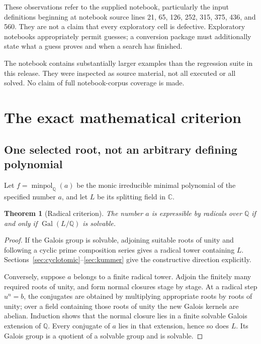 \documentclass[11pt,a4paper]{article}
\newcommand{\Q}{\mathbb Q}
\newcommand{\C}{\mathbb C}
\newcommand{\Gal}{\operatorname{Gal}}
\newcommand{\minpol}{\operatorname{minpol}}
\newtheorem{theorem}{Theorem}[section]
\theoremstyle{definition}
\theoremstyle{remark}
\begin{document}
These observations refer to the supplied notebook, particularly the input definitions beginning at notebook source lines 21, 65, 126, 252, 315, 375, 436, and 560. They are not a claim that every exploratory cell is defective. Exploratory notebooks appropriately permit guesses; a conversion package must additionally state what a guess proves and when a search has finished.

The notebook contains substantially larger examples than the regression suite in this release. They were inspected as source material, not all executed or all solved. No claim of full notebook-corpus coverage is made.

\section{The exact mathematical criterion}

\subsection{One selected root, not an arbitrary defining polynomial}

Let $f=\minpol_{\Q}(a)$ be the monic irreducible minimal polynomial of the specified number $a$, and let $L$ be its splitting field in $\C$.

\begin{theorem}[Radical criterion]\label{thm:criterion}
The number $a$ is expressible by radicals over $\Q$ if and only if $\Gal(L/\Q)$ is solvable.
\end{theorem}
\begin{proof}
If the Galois group is solvable, adjoining suitable roots of unity and following a cyclic prime composition series gives a radical tower containing $L$. Sections~\ref{sec:cyclotomic}--\ref{sec:kummer} give the constructive direction explicitly.

Conversely, suppose $a$ belongs to a finite radical tower. Adjoin the finitely many required roots of unity, and form normal closures stage by stage. At a radical step $u^n=b$, the conjugates are obtained by multiplying appropriate roots by roots of unity; over a field containing those roots of unity the new Galois kernels are abelian. Induction shows that the normal closure lies in a finite solvable Galois extension of $\Q$. Every conjugate of $a$ lies in that extension, hence so does $L$. Its Galois group is a quotient of a solvable group and is solvable.
\end{proof}
\end{document}
